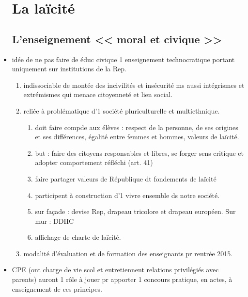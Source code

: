 \documentclass[12pt]{report}
\begin{document}
\begin{itemize}
\section{La laïcité}

\subsection{L'enseignement << moral et civique >>}

\item idée de ne pas faire  de éduc civique 1 enseignement technocratique portant uniquement sur institutions de la Rep.\\
\begin{enumerate}
\item indissociable de montée des incivilités et insécurité ms aussi intégrismes et extrémismes qui menace citoyenneté et lien social. \\
\item reliée à problématique d'1 société pluriculturelle et multiethnique.
\begin{enumerate}
\item doit faire compde aux élèves : respect de la personne, de ses origines et ses différences, égalité entre femmes et hommes, valeurs de laïcité.\\
\item but : faire des citoyens responsables et libres, se forger sens critique et adopter comportement réfléchi (art. 41) \\
\item faire partager valeurs de République dt fondements de laïcité \\
\item participent à  construction d'1 vivre ensemble ds notre société. \\
\item sur façade : devise Rep, drapeau tricolore et drapeau européen. Sur mur : DDHC \\
\item affichage de charte de laïcité. \\
\end{enumerate}

\item modalité d'évaluation et de formation des enseignants pr rentrée 2015. \\
\end{enumerate}

\item CPE (ont charge de vie scol et entretiennent relations privilégiés avec parents) auront 1 rôle à jouer pr apporter 1 concours pratique, en actes, à enseignement de ces principes. \\



\end{itemize}
\end{document}
